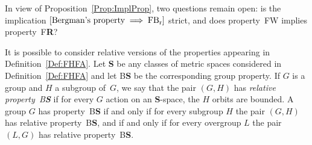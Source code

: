 \documentclass[a4paper]{article}
\theoremstyle{definition}
\newcommand*{\category}[1]{\textbf{#1}}
\newcommand*{\CatS}{\category{S}}
\newcommand*{\BS}{B\textbf{S}}
\newcommand*{\FB}{FB\textsubscript{r}}
\newcommand*{\FH}{FH}
\newcommand*{\FW}{FW}
\newcommand*{\FR}{F\textbf{R}}
\begin{document}
In view of Proposition~\ref{Prop:ImplProp}, two questions remain open: is the implication $[\textnormal{Bergman's property}\implies\textnormal{\FB}]$ strict, and does property~\FW{} implies property~\FR?


It is possible to consider relative versions of the properties appearing in Definition~\ref{Def:FHFA}.
Let \CatS{} be any classes of metric spaces considered in Definition~\ref{Def:FHFA} and let \BS{} be the corresponding group property.
If $G$ is a group and $H$ a subgroup of~$G$, we say that the pair $(G,H)$ has \emph{relative property~\BS} if for every $G$ action on an \CatS-space, the $H$ orbits are bounded.
A group $G$ has property~\BS{} if and only if for every subgroup $H$ the pair $(G,H)$ has relative property~\BS{}, and if and only if for every overgroup $L$ the pair $(L,G)$ has relative property~\BS.
%
%
%
%
%
%
%
%
%
\end{document}
